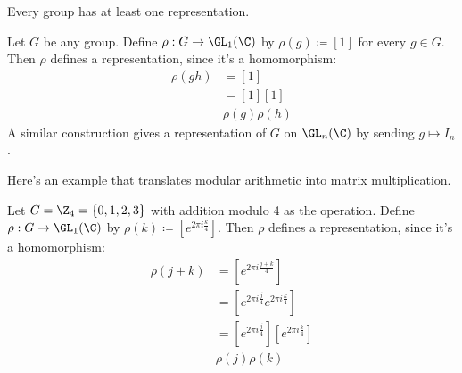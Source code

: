 Every group has at least one representation.

\begin{example}
    Let $G$ be any group.
    Define $\rho:G\to \GL_1(\C)$ by $\rho(g) \coloneq [1]$ for every $g\in G$.
    Then $\rho$ defines a representation, since it's a homomorphism:
    \begin{align*}
        \rho(gh) & = [1] \\
        & = [1][1] \\
        & \rho(g) \rho(h)
    \end{align*}
    A similar construction gives a representation of $G$ on $\GL_n(\C)$ by sending $g\mapsto I_n$.
\end{example}

Here's an example that translates modular arithmetic into matrix multiplication.

\begin{example}
    Let $G = \Z_4 = \{ 0,1,2,3 \}$ with addition modulo 4 as the operation.
    Define $\rho:G\to \GL_1(\C)$ by $\rho(k) \coloneq [e^{2\pi i \frac{k}{4}}]$.
    Then $\rho$ defines a representation, since it's a homomorphism:
    \begin{align*}
        \rho(j+k) & = [ e^{2\pi i \frac{j+k}{4}} ] \\
        & = [ e^{2\pi i \frac{j}{4}} e^{2\pi i \frac{k}{4}} ] \\
        & = [ e^{2\pi i \frac{j}{4}} ][ e^{2\pi i \frac{k}{4}} ] \\
        & \rho(j) \rho(k)
    \end{align*}
\end{example}